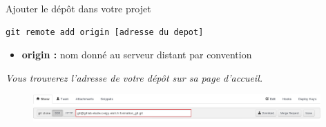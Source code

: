 \documentclass{beamer}
\begin{document}
\begin{frame}[fragile]{Ajouter le dépôt dans votre projet}
	\begin{lstlisting}[frame=single]
		git remote add origin [adresse du depot]
	\end{lstlisting}
	
	\begin{itemize}
		\item \textbf{origin :} nom donné au serveur distant par convention
	\end{itemize}
	\bigskip
	
	\begin{center}
	\textit{Vous trouverez l'adresse de votre dépôt sur sa page d'accueil.}
	\end{center}
	\vspace{-.5cm}
	\begin{figure}
			\centering
			\includegraphics[width=11cm]{img/shot13}
	\end{figure}
	
\end{frame}
\end{document}
